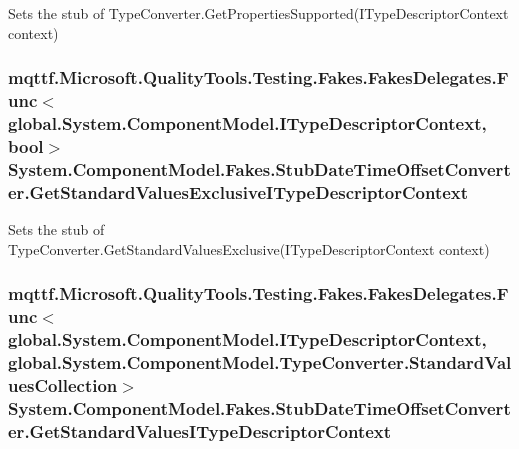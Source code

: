 Sets the stub of Type\-Converter.\-Get\-Properties\-Supported(\-I\-Type\-Descriptor\-Context context)

\hypertarget{class_system_1_1_component_model_1_1_fakes_1_1_stub_date_time_offset_converter_a7f0784707d669c9ac6fea3f3ac37a104}{
\subsubsection[{Get\-Standard\-Values\-Exclusive\-I\-Type\-Descriptor\-Context}]{\setlength{\rightskip}{0pt plus 5cm}mqttf.\-Microsoft.\-Quality\-Tools.\-Testing.\-Fakes.\-Fakes\-Delegates.\-Func$<$global.\-System.\-Component\-Model.\-I\-Type\-Descriptor\-Context, bool$>$ System.\-Component\-Model.\-Fakes.\-Stub\-Date\-Time\-Offset\-Converter.\-Get\-Standard\-Values\-Exclusive\-I\-Type\-Descriptor\-Context}}\label{class_system_1_1_component_model_1_1_fakes_1_1_stub_date_time_offset_converter_a7f0784707d669c9ac6fea3f3ac37a104}


Sets the stub of Type\-Converter.\-Get\-Standard\-Values\-Exclusive(\-I\-Type\-Descriptor\-Context context)

\hypertarget{class_system_1_1_component_model_1_1_fakes_1_1_stub_date_time_offset_converter_a1969a8ffd176d8f809b6b0d988287163}{
\subsubsection[{Get\-Standard\-Values\-I\-Type\-Descriptor\-Context}]{\setlength{\rightskip}{0pt plus 5cm}mqttf.\-Microsoft.\-Quality\-Tools.\-Testing.\-Fakes.\-Fakes\-Delegates.\-Func$<$global.\-System.\-Component\-Model.\-I\-Type\-Descriptor\-Context, global.\-System.\-Component\-Model.\-Type\-Converter.\-Standard\-Values\-Collection$>$ System.\-Component\-Model.\-Fakes.\-Stub\-Date\-Time\-Offset\-Converter.\-Get\-Standard\-Values\-I\-Type\-Descriptor\-Context}}\label{class_system_1_1_component_model_1_1_fakes_1_1_stub_date_time_offset_converter_a1969a8ffd176d8f809b6b0d988287163}


